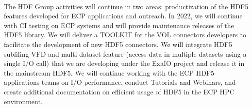 \paragraph{}
The HDF Group activities will continue in two areas:  productization of the HDF5 features developed for ECP applications and outreach. In 2022, we will continue with CI testing on ECP systems and will provide maintenance releases of the HDF5 library.  We will deliver a TOOLKIT for the VOL connectors developers to facilitate the development of new HDF5 connectors. We will integrate HDF5 subfiling VFD and multi-dataset feature (access data in multiple datasets using a single I/O call) that we are developing under the ExaIO project and release it in the mainstream HDF5. We will continue working with the ECP HDF5 applications teams on I/O performance, conduct Tutorials and Webinars, and create additional documentation on efficient usage of HDF5 in the ECP HPC environment. 
